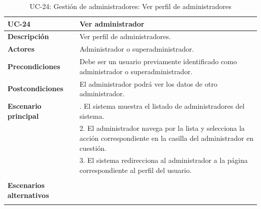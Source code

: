 \begin{table}
  \begin{center}
    \begin{tabularx}{16.4cm}{|l|X|}
      \hline
      \textbf{UC-24} & \textbf{Ver administrador}\\
      \hline
      \textbf{Descripción} & Ver perfil de administradores. \\
      \hline
      \textbf{Actores} & Administrador o superadministrador.\\
      \hline
      \textbf{Precondiciones} & Debe ser un usuario previamente identificado como administrador o superadministrador.\\
      \hline
      \textbf{Postcondiciones} & El administrador podrá ver los datos de otro administrador.\\
      \hline
      \textbf{Escenario principal} & \smallskip 1. El sistema muestra el listado de administradores del sistema.\\
      & 2. El administrador navega por la lista y selecciona la acción correspondiente en la casilla del administrador en cuestión.\\
      & 3. El sistema redirecciona al administrador a la página correspondiente al perfil del usuario.\\
      & \\
      \hline
      \textbf{Escenarios alternativos} & \\
      & \\
      \hline
    \end{tabularx}
    \caption{UC-24: Gestión de administradores: Ver perfil de administradores}
    \label{tab:CU-ver-perfil-de-admin}
  \end{center}
\end{table}


